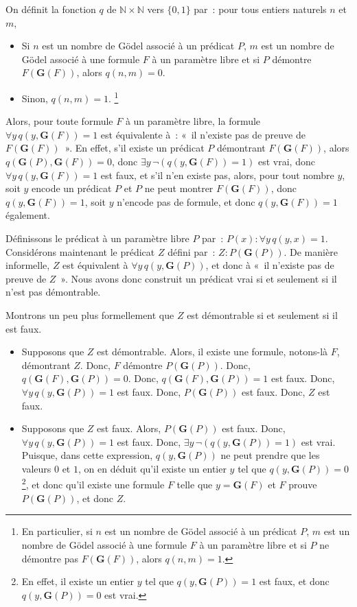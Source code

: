 On définit la fonction $q$ de $\mathbb{N} \times \mathbb{N}$ vers $\lbrace 0, 1 \rbrace$ par : pour tous entiers naturels $n$ et $m$, 
\begin{itemize}[nosep]
    \item Si $n$ est un nombre de Gödel associé à un prédicat $P$, $m$ est un nombre de Gödel associé à une formule $F$ à un paramètre libre et si $P$ démontre $F(\mathbf{G}(F))$, alors $q(n, m) = 0$.
    \item Sinon, $q(n, m) = 1$.%
        \footnote{En particulier, si $n$ est un nombre de Gödel associé à un prédicat $P$, $m$ est un nombre de Gödel associé à une formule $F$ à un paramètre libre et si $P$ ne démontre pas $F(\mathbf{G}(F))$, alors $q(n, m) = 1$.}
\end{itemize}
Alors, pour toute formule $F$ à un paramètre libre, la formule $\forall y \, q(y, \mathbf{G}(F)) = 1$ est équivalente à : « il n'existe pas de preuve de $F(\mathbf{G}(F))$ ». 
En effet, s'il existe un prédicat $P$ démontrant $F(\mathbf{G}(F))$, alors $q(\mathbf{G}(P), \mathbf{G}(F)) = 0$, donc $\exists y \, \neg (q(y, \mathbf{G}(F)) = 1)$ est vrai, donc $\forall y \, q(y, \mathbf{G}(F)) = 1$ est faux, et s'il n'en existe pas, alors, pour tout nombre $y$, soit $y$ encode un prédicat $P$ et $P$ ne peut montrer $F(\mathbf{G}(F))$, donc $q(y, \mathbf{G}(F)) = 1$, soit $y$ n'encode pas de formule, et donc $q(y, \mathbf{G}(F)) = 1$ également.

Définissons le prédicat à un paramètre libre $P$ par : $P(x): \forall y \, q(y, x) = 1$. 
Considérons maintenant le prédicat $Z$ défini par : $Z: P(\mathbf{G}(P))$. 
De manière informelle, $Z$ est équivalent à $\forall y \, q(y, \mathbf{G}(P))$, et donc à « il n'existe pas de preuve de $Z$ ». 
Nous avons donc construit un prédicat vrai si et seulement si il n'est pas démontrable. 

Montrons un peu plus formellement que $Z$ est démontrable si et seulement si il est faux.
\begin{itemize}[nosep]
    \item Supposons que $Z$ est démontrable. 
        Alors, il existe une formule, notons-là $F$, démontrant $Z$. 
        Donc, $F$ démontre $P(\mathbf{G}(P))$.
        Donc, $q(\mathbf{G}(F), \mathbf{G}(P)) = 0$. 
        Donc, $q(\mathbf{G}(F), \mathbf{G}(P)) = 1$ est faux. 
        Donc, $\forall y \, q(y,\mathbf{G}(P)) = 1$ est faux.
        Donc, $P(\mathbf{G}(P))$ est faux.
        Donc, $Z$ est faux.
    \item Supposons que $Z$ est faux.
        Alors, $P(\mathbf{G}(P))$ est faux.
        Donc, $\forall y \, q(y,\mathbf{G}(P)) = 1$ est faux.
        Donc, $\exists y \, \neg (q(y,\mathbf{G}(P)) = 1)$ est vrai.
        Puisque, dans cette expression, $q(y,\mathbf{G}(P))$ ne peut prendre que les valeurs $0$ et $1$, on en déduit qu'il existe un entier $y$ tel que $q(y,\mathbf{G}(P)) = 0$\footnote{En effet, il existe un entier $y$ tel que $q(y,\mathbf{G}(P)) = 1$ est faux, et donc $q(y,\mathbf{G}(P)) = 0$ est vrai.}, et donc qu'il existe une formule $F$ telle que $y = \mathbf{G}(F)$ et $F$ prouve $P(\mathbf{G}(P))$, et donc $Z$. 
\end{itemize}


